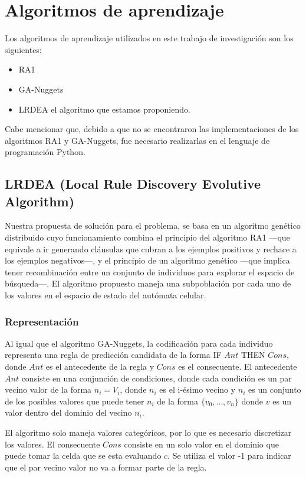 \section{Algoritmos de aprendizaje}
Los algoritmos de aprendizaje utilizados en este trabajo de investigación son los siguientes:
\begin{itemize}
	\item RA1
	\item GA-Nuggets
	\item LRDEA el algoritmo que estamos proponiendo.
\end{itemize}

Cabe mencionar que, debido a que no se encontraron las implementaciones de los algoritmos RA1 y GA-Nuggets, fue necesario realizarlas en el lenguaje de programación Python.

\subsection{LRDEA (Local Rule Discovery Evolutive Algorithm)}

Nuestra propuesta de solución para el problema, se basa en un algoritmo genético distribuido cuyo funcionamiento combina el principio del algoritmo RA1 ---que equivale a ir generando cláusulas que cubran a los ejemplos positivos y rechace a los ejemplos negativos---, y el principio de un algoritmo genético ---que implica tener recombinación entre un conjunto de individuos para explorar el espacio de búsqueda---.  El algoritmo propuesto maneja una subpoblación por cada uno de los valores en el espacio de estado del autómata celular.

\subsubsection{Representación}

Al igual que el algoritmo GA-Nuggets, la codificación para cada individuo representa una regla de predicción candidata de la forma IF $Ant$ THEN $Cons$, donde $Ant$ es el antecedente de la regla y $Cons$ es el consecuente. El antecedente $Ant$ consiste en una conjunción de condiciones, donde cada condición es un par vecino valor de la forma $n_i = V_i$, donde $n_i$ es el i-ésimo vecino y $n_{i}$ es un conjunto de los posibles valores que puede tener $n_i$ de la forma $\{v_{0},\dots,v_{n}\}$ donde $v$ es un valor dentro del dominio del vecino $n_i$.

El algoritmo solo maneja valores categóricos, por lo que es necesario discretizar los valores. El consecuente $Cons$ consiste en un solo valor en el dominio que puede tomar la celda que se esta evaluando $c$. Se utiliza el valor -1 para indicar que el par vecino valor no va a formar parte de la regla.


